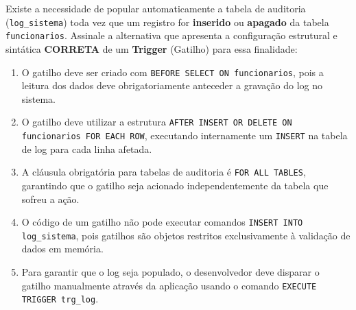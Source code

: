 \documentclass[12pt,a4paper]{article}
\begin{document}
\begin{enumerate}
\begin{center}
    \end{center}
    \vspace{0.3cm}

    Existe a necessidade de popular automaticamente a tabela de auditoria (\texttt{log\_sistema}) toda vez que um registro for \textbf{inserido} ou \textbf{apagado} da tabela \texttt{funcionarios}. Assinale a alternativa que apresenta a configuração estrutural e sintática \textbf{CORRETA} de um \textbf{Trigger} (Gatilho) para essa finalidade:
    
    \begin{enumerate}[label=\alph*)]
        \item O gatilho deve ser criado com \texttt{BEFORE SELECT ON funcionarios}, pois a leitura dos dados deve obrigatoriamente anteceder a gravação do log no sistema.
        \item O gatilho deve utilizar a estrutura \texttt{AFTER INSERT OR DELETE ON funcionarios FOR EACH ROW}, executando internamente um \texttt{INSERT} na tabela de log para cada linha afetada.
        \item A cláusula obrigatória para tabelas de auditoria é \texttt{FOR ALL TABLES}, garantindo que o gatilho seja acionado independentemente da tabela que sofreu a ação.
        \item O código de um gatilho não pode executar comandos \texttt{INSERT INTO log\_sistema}, pois gatilhos são objetos restritos exclusivamente à validação de dados em memória.
        \item Para garantir que o log seja populado, o desenvolvedor deve disparar o gatilho manualmente através da aplicação usando o comando \texttt{EXECUTE TRIGGER trg\_log}.
    \end{enumerate}


\end{enumerate}
\end{document}
